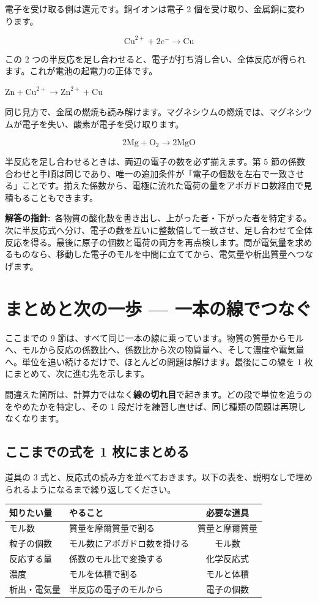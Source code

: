 \documentclass{article}
\begin{document}
電子を受け取る側は還元です。銅イオンは電子 2 個を受け取り、金属銅に変わります。

\[ \mathrm{Cu}^{2+} + 2e^{-} \rightarrow \mathrm{Cu} \]

この 2 つの半反応を足し合わせると、電子が打ち消し合い、全体反応が得られます。これが電池の起電力の正体です。

\( \mathrm{Zn} + \mathrm{Cu}^{2+} \rightarrow \mathrm{Zn}^{2+} + \mathrm{Cu} \)

同じ見方で、金属の燃焼も読み解けます。マグネシウムの燃焼では、マグネシウムが電子を失い、酸素が電子を受け取ります。

\[ 2\mathrm{Mg} + \mathrm{O}_{2} \rightarrow 2\mathrm{MgO} \]

半反応を足し合わせるときは、両辺の電子の数を必ず揃えます。第 5 節の係数合わせと手順は同じであり、唯一の追加条件が「電子の個数を左右で一致させる」ことです。揃えた係数から、電極に流れた電荷の量をアボガドロ数経由で見積もることもできます。

\textbf{解答の指針:}\ 各物質の酸化数を書き出し、上がった者・下がった者を特定する。次に半反応式へ分け、電子の数を互いに整数倍して一致させ、足し合わせて全体反応を得る。最後に原子の個数と電荷の両方を再点検します。問が電気量を求めるものなら、移動した電子のモルを中間に立ててから、電気量や析出質量へつなげます。

\section{まとめと次の一歩 — 一本の線でつなぐ}

ここまでの 9 節は、すべて同じ一本の線に乗っています。物質の質量からモルへ、モルから反応の係数比へ、係数比から次の物質量へ、そして濃度や電気量へ。単位を追い続けるだけで、ほとんどの問題は解けます。最後にこの線を 1 枚にまとめて、次に進む先を示します。

間違えた箇所は、計算力ではなく\textbf{線の切れ目}で起きます。どの段で単位を追うのをやめたかを特定し、その 1 段だけを練習し直せば、同じ種類の問題は再現しなくなります。

\subsection{ここまでの式を 1 枚にまとめる}

道具の 3 式と、反応式の読み方を並べておきます。以下の表を、説明なしで埋められるようになるまで繰り返してください。

\begin{center}
\begin{tabular}{|l|l|c|}
\hline
知りたい量 & やること & 必要な道具 \\
\hline
モル数 & 質量を摩爾質量で割る & 質量と摩爾質量 \\
粒子の個数 & モル数にアボガドロ数を掛ける & モル数 \\
反応する量 & 係数のモル比で変換する & 化学反応式 \\
濃度 & モルを体積で割る & モルと体積 \\
析出・電気量 & 半反応の電子のモルから & 電子の個数 \\
\hline
\end{tabular}
\end{center}
\end{document}
